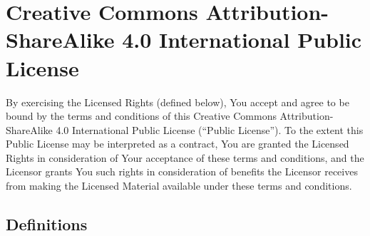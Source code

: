 \chapter{Creative Commons Attribution-ShareAlike 4.0 International
  Public License}
\label{license}

\renewcommand*\thesection{\arabic{section}}

By exercising the Licensed Rights (defined below), You accept and agree
to be bound by the terms and conditions of this Creative Commons
Attribution-ShareAlike 4.0 International Public License (``Public
License''). To the extent this Public License may be interpreted as a
contract, You are granted the Licensed Rights in consideration of Your
acceptance of these terms and conditions, and the Licensor grants You
such rights in consideration of benefits the Licensor receives from
making the Licensed Material available under these terms and
conditions.

\section{Definitions}

